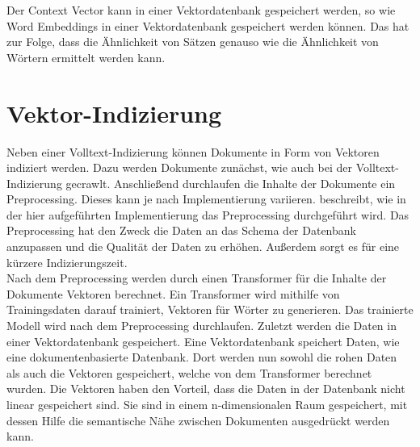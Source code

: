 Der Context Vector kann in einer Vektordatenbank gespeichert werden, so wie Word Embeddings in einer Vektordatenbank gespeichert werden können.
Das hat zur Folge, dass die Ähnlichkeit von Sätzen genauso wie die Ähnlichkeit von Wörtern ermittelt werden kann.

\section{Vektor-Indizierung}
\label{chap:vektorindizes}
Neben einer Volltext-Indizierung können Dokumente in Form von Vektoren indiziert werden.
Dazu werden Dokumente zunächst, wie auch bei der Volltext-Indizierung gecrawlt.
Anschließend durchlaufen die Inhalte der Dokumente ein Preprocessing.
Dieses kann je nach Implementierung variieren.
 beschreibt, wie in der hier aufgeführten Implementierung das Preprocessing durchgeführt wird.
Das Preprocessing hat den Zweck die Daten an das Schema der Datenbank anzupassen und die Qualität der Daten zu erhöhen.
Außerdem sorgt es für eine kürzere Indizierungszeit.\\

Nach dem Preprocessing werden durch einen Transformer für die Inhalte der Dokumente Vektoren berechnet.
Ein Transformer wird mithilfe von Trainingsdaten darauf trainiert, Vektoren für Wörter zu generieren.
Das trainierte Modell wird nach dem Preprocessing durchlaufen.
Zuletzt werden die Daten in einer Vektordatenbank gespeichert.
Eine Vektordatenbank speichert Daten, wie eine dokumentenbasierte Datenbank.
Dort werden nun sowohl die rohen Daten als auch die Vektoren gespeichert, welche von dem Transformer berechnet wurden.
Die Vektoren haben den Vorteil, dass die Daten in der Datenbank nicht linear gespeichert sind.
Sie sind in einem n-dimensionalen Raum gespeichert, mit dessen Hilfe die semantische Nähe zwischen Dokumenten ausgedrückt werden kann.

